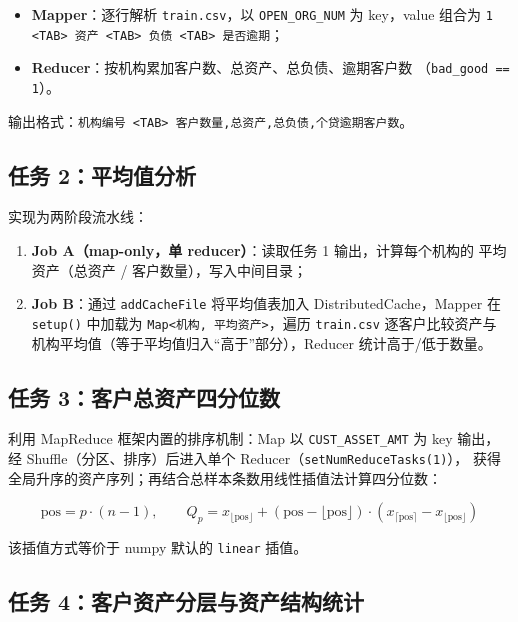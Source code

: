 \documentclass[UTF8,a4paper,12pt]{ctexart}
\begin{document}
\begin{itemize}
  \item \textbf{Mapper}：逐行解析 \texttt{train.csv}，以 \texttt{OPEN\_ORG\_NUM}
        为 key，value 组合为 \texttt{1 <TAB> 资产 <TAB> 负债 <TAB> 是否逾期}；
  \item \textbf{Reducer}：按机构累加客户数、总资产、总负债、逾期客户数
        （\texttt{bad\_good == 1}）。
\end{itemize}

输出格式：\texttt{机构编号 <TAB> 客户数量,总资产,总负债,个贷逾期客户数}。

\subsection{任务 2：平均值分析}

实现为两阶段流水线：

\begin{enumerate}
  \item \textbf{Job A（map-only，单 reducer）}：读取任务 1 输出，计算每个机构的
        平均资产（总资产 / 客户数量），写入中间目录；
  \item \textbf{Job B}：通过 \texttt{addCacheFile} 将平均值表加入
        DistributedCache，Mapper 在 \texttt{setup()} 中加载为
        \texttt{Map<机构, 平均资产>}，遍历 \texttt{train.csv} 逐客户比较资产与
        机构平均值（等于平均值归入“高于”部分），Reducer 统计高于/低于数量。
\end{enumerate}

\subsection{任务 3：客户总资产四分位数}

利用 MapReduce 框架内置的排序机制：Map 以 \texttt{CUST\_ASSET\_AMT} 为 key 输出，
经 Shuffle（分区、排序）后进入单个 Reducer（\texttt{setNumReduceTasks(1)}），
获得全局升序的资产序列；再结合总样本条数用线性插值法计算四分位数：

\[
\mathrm{pos} = p \cdot (n - 1), \qquad
Q_p = x_{\lfloor \mathrm{pos} \rfloor}
      + (\mathrm{pos} - \lfloor \mathrm{pos} \rfloor)
        \cdot (x_{\lceil \mathrm{pos} \rceil} - x_{\lfloor \mathrm{pos} \rfloor})
\]

该插值方式等价于 numpy 默认的 \texttt{linear} 插值。

\subsection{任务 4：客户资产分层与资产结构统计}
\end{document}
